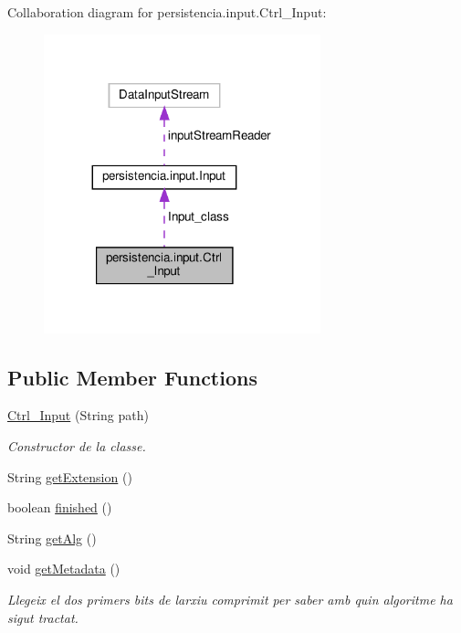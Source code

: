 Collaboration diagram for persistencia.\+input.\+Ctrl\+\_\+\+Input\+:
\nopagebreak
\begin{figure}[H]
\begin{center}
\leavevmode
\includegraphics[width=227pt]{classpersistencia_1_1input_1_1Ctrl__Input__coll__graph}
\end{center}
\end{figure}
\subsection*{Public Member Functions}
\begin{DoxyCompactItemize}
\item 
\hyperlink{classpersistencia_1_1input_1_1Ctrl__Input_a00f3fa14d0329d6e4b9ddbe39ada1258}{Ctrl\+\_\+\+Input} (String path)
\begin{DoxyCompactList}\small\item\em Constructor de la classe. \end{DoxyCompactList}\item 
String \hyperlink{classpersistencia_1_1input_1_1Ctrl__Input_a46d569c2f3ceb0ab6cf9900708b3316a}{get\+Extension} ()
\item 
boolean \hyperlink{classpersistencia_1_1input_1_1Ctrl__Input_a5a94d207dce0fd592b5ac17f55154d4f}{finished} ()
\item 
String \hyperlink{classpersistencia_1_1input_1_1Ctrl__Input_aa69f79fb581f6d80c5a9609148794570}{get\+Alg} ()
\item 
\mbox{\label{classpersistencia_1_1input_1_1Ctrl__Input_a46e05fce164a6803820c02565c1769c8}} 
void \hyperlink{classpersistencia_1_1input_1_1Ctrl__Input_a46e05fce164a6803820c02565c1769c8}{get\+Metadata} ()
\begin{DoxyCompactList}\small\item\em Llegeix el dos primers bits de l\textquotesingle{}arxiu comprimit per saber amb quin algoritme ha sigut tractat. \end{DoxyCompactList}\end{DoxyCompactItemize}
